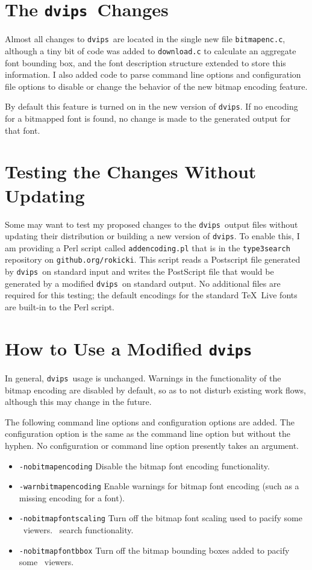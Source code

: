 \documentclass{ltugboat}
\def\PDF{\acro{PDF}}
\def\dvips{\texttt{dvips}}
\begin{document}
\section{The \dvips\ Changes}

Almost all changes to \dvips\ are located in the single new
file \texttt{bitmapenc.c}, although a tiny bit of code was
added to \texttt{download.c} to calculate an aggregate font
bounding box, and the font description structure extended to
store this information.  I also added code to parse command
line options and configuration file options to disable or
change the behavior of the new bitmap encoding feature.

By default this feature is turned on in the new version of
\dvips.  If no encoding for a bitmapped font is found, no
change is made to the generated output for that font.

\section{Testing the Changes Without Updating}

Some may want to test my proposed changes to the \dvips\ output
files without updating their distribution or building a new
version of \dvips.  To enable this, I am providing a Perl
script called \texttt{addencoding.pl} that is in the
\texttt{type3search} repository on \texttt{github.org/rokicki}.
This script reads a Postscript file generated by \dvips\ on
standard input and writes the PostScript file that would be
generated by a modified \dvips\ on standard output.  No
additional files are required for this testing; the default
encodings for the standard \TeX\ Live fonts are built-in to
the Perl script.

\section{How to Use a Modified \dvips}

In general, \dvips\ usage is unchanged.  Warnings in
the functionality of the bitmap encoding are disabled by default,
so as to not disturb existing work flows, although this may
change in the future.

The following command line options and configuration options are
added.  The configuration option is the same as the command line
option but without the hyphen.  No configuration or command line
option presently takes an argument.

\begin{itemize}
\item \texttt{-nobitmapencoding} Disable the bitmap font encoding
functionality.
\item \texttt{-warnbitmapencoding} Enable warnings for bitmap font
encoding (such as a missing encoding for a font).
\item \texttt{-nobitmapfontscaling} Turn off the bitmap font
scaling used to pacify some \PDF\ viewers.
\PDF\ search functionality.
\item \texttt{-nobitmapfontbbox} Turn off the bitmap bounding
boxes added to pacify some \PDF\ viewers.
\end{itemize}
\end{document}
